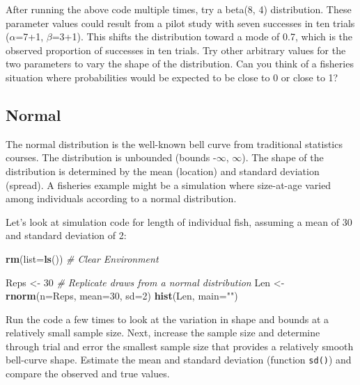 \documentclass[
]{krantz}
\makeatletter
\newenvironment{Shaded}{\begin{snugshade}}{\end{snugshade}}
\newcommand{\AttributeTok}[1]{\textcolor[rgb]{0.27,0.27,0.27}{#1}}
\newcommand{\CommentTok}[1]{\textcolor[rgb]{0.37,0.37,0.37}{\textit{#1}}}
\newcommand{\DecValTok}[1]{\textcolor[rgb]{0.06,0.06,0.06}{#1}}
\newcommand{\FunctionTok}[1]{\textcolor[rgb]{0.27,0.27,0.27}{\textbf{#1}}}
\newcommand{\NormalTok}[1]{#1}
\newcommand{\OtherTok}[1]{\textcolor[rgb]{0.37,0.37,0.37}{#1}}
\newcommand{\StringTok}[1]{\textcolor[rgb]{0.5,0.5,0.5}{#1}}
\newenvironment{kframe}{%
\medskip{}
\setlength{\fboxsep}{.8em}
 \def\at@end@of@kframe{}%
 \ifinner\ifhmode%
  \def\at@end@of@kframe{\end{minipage}}%
  \begin{minipage}{\columnwidth}%
 \fi\fi%
 \def\FrameCommand##1{\hskip\@totalleftmargin \hskip-\fboxsep
 \colorbox{shadecolor}{##1}\hskip-\fboxsep
     \hskip-\linewidth \hskip-\@totalleftmargin \hskip\columnwidth}%
 \MakeFramed {\advance\hsize-\width
   \@totalleftmargin\z@ \linewidth\hsize
   \@setminipage}}%
 {\par\unskip\endMakeFramed%
 \at@end@of@kframe}
\renewenvironment{Shaded}{\begin{kframe}}{\end{kframe}}
\makeatother
\begin{document}
After running the above code multiple times, try a beta(8, 4) distribution. These parameter values could result from a pilot study with seven successes in ten trials (\(\alpha\)=7+1, \(\beta\)=3+1). This shifts the distribution toward a mode of 0.7, which is the observed proportion of successes in ten trials. Try other arbitrary values for the two parameters to vary the shape of the distribution. Can you think of a fisheries situation where probabilities would be expected to be close to 0 or close to 1?

\hypertarget{NormalDist}{%
\subsection{Normal}\label{NormalDist}}

The normal distribution is the well-known bell curve from traditional statistics courses. The distribution is unbounded (bounds -\(\infty\), \(\infty\)). The shape of the distribution is determined by the mean (location) and standard deviation (spread). A fisheries example might be a simulation where size-at-age varied among individuals according to a normal distribution.

Let's look at simulation code for length of individual fish, assuming a mean of 30 and standard deviation of 2:

\begin{Shaded}
\begin{Highlighting}[]
\FunctionTok{rm}\NormalTok{(}\AttributeTok{list=}\FunctionTok{ls}\NormalTok{()) }\CommentTok{\# Clear Environment}

\NormalTok{Reps }\OtherTok{\textless{}{-}} \DecValTok{30} \CommentTok{\# Replicate draws from a normal distribution}
\NormalTok{Len }\OtherTok{\textless{}{-}} \FunctionTok{rnorm}\NormalTok{(}\AttributeTok{n=}\NormalTok{Reps, }\AttributeTok{mean=}\DecValTok{30}\NormalTok{, }\AttributeTok{sd=}\DecValTok{2}\NormalTok{)}
\FunctionTok{hist}\NormalTok{(Len, }\AttributeTok{main=}\StringTok{""}\NormalTok{)}
\end{Highlighting}
\end{Shaded}

Run the code a few times to look at the variation in shape and bounds at a relatively small sample size. Next, increase the sample size and determine through trial and error the smallest sample size that provides a relatively smooth bell-curve shape. Estimate the mean and standard deviation (function \texttt{sd()}) and compare the observed and true values.
\end{document}
